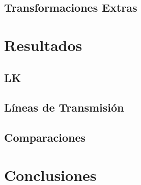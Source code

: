 \documentclass[10pt,handout]{beamer}
\begin{document}
	\subsection{Transformaciones Extras}
\section{Resultados}
	\subsection{LK}
	\subsection{Líneas de Transmisión}
	\subsection{Comparaciones}
\section{Conclusiones}
\end{document}
